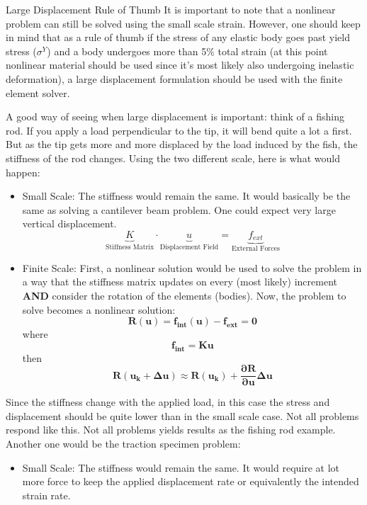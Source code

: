\begin{keyconcept}{Large Displacement Rule of Thumb}
    It is important to note that a nonlinear problem can still be solved using the small scale strain. However, one should keep in mind that as a rule of thumb if the stress of any elastic body goes past yield stress ($\sigma^Y$) and a body undergoes more than 5\% total strain (at this point nonlinear material should be used since it's most likely also undergoing inelastic deformation), a large displacement formulation should be used with the finite element solver.

    A good way of seeing when large displacement is important: think of a fishing rod. If you apply a load perpendicular to the tip, it will bend quite a lot a first. But as the tip gets more and more displaced by the load induced by the fish, the stiffness of the rod changes. Using the two different scale, here is what would happen:
    \begin{itemize}
        \item Small Scale: The stiffness would remain the same. It would basically be the same as solving a cantilever beam problem. One could expect very large vertical displacement.
        $$
            \underbrace{K}_{\text{Stiffness Matrix}}
            \cdot
            \underbrace{u}_{\text{Displacement Field}}
            =
            \underbrace{f_{ext}}_{\text{External Forces}}
        $$
        
        \item Finite Scale: First, a nonlinear solution would be used to solve the problem in a way that the stiffness matrix updates on every (most likely) increment \textbf{AND} consider the rotation of the elements (bodies). Now, the problem to solve becomes a nonlinear solution:
        $$
            \mathbf{R(u)=f_{int}(u) - f_{ext}=0}
        $$
        where
        $$
            \mathbf{f_{int}=K u}
        $$
        then
        $$
            \mathbf{R(u_k + \Delta u) \approx R(u_k) + \dfrac{\partial R}{\partial u}\Delta u}
        $$
    \end{itemize}

    Since the stiffness change with the applied load, in this case the stress and displacement should be quite lower than in the small scale case. Not all problems respond like this. Not all problems yields results as the fishing rod example. Another one would be the traction specimen problem:
        \begin{itemize}
        \item Small Scale: The stiffness would remain the same. It would require at lot more force to keep the applied displacement rate or equivalently the intended strain rate. 
  

\end{itemize}
\end{keyconcept}
